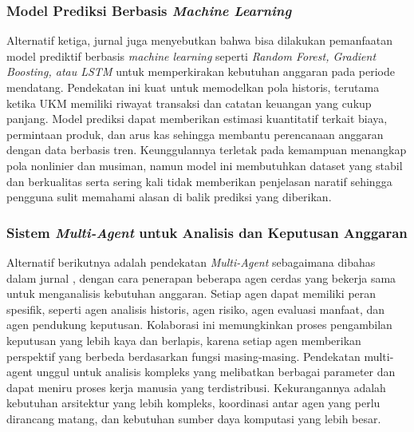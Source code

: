 \subsubsection{Model Prediksi Berbasis  \textit{Machine Learning}}
Alternatif ketiga, jurnal \textcite{Vivet2023} juga menyebutkan bahwa bisa dilakukan pemanfaatan model prediktif berbasis \textit{machine learning} seperti \textit{Random Forest, Gradient Boosting, atau LSTM} untuk memperkirakan kebutuhan anggaran pada periode mendatang. Pendekatan ini kuat untuk memodelkan pola historis, terutama ketika UKM memiliki riwayat transaksi dan catatan keuangan yang cukup panjang. Model prediksi dapat memberikan estimasi kuantitatif terkait biaya, permintaan produk, dan arus kas sehingga membantu perencanaan anggaran dengan data berbasis tren. Keunggulannya terletak pada kemampuan menangkap pola nonlinier dan musiman, namun model ini membutuhkan dataset yang stabil dan berkualitas serta sering kali tidak memberikan penjelasan naratif sehingga pengguna sulit memahami alasan di balik prediksi yang diberikan.

\subsubsection{Sistem \textit{Multi-Agent} untuk Analisis dan Keputusan Anggaran}
Alternatif berikutnya adalah pendekatan \textit{Multi-Agent} sebagaimana dibahas dalam jurnal \textcite{Joshi2025}, dengan cara penerapan beberapa agen cerdas yang bekerja sama untuk menganalisis kebutuhan anggaran. Setiap agen dapat memiliki peran spesifik, seperti agen analisis historis, agen risiko, agen evaluasi manfaat, dan agen pendukung keputusan. Kolaborasi ini memungkinkan proses pengambilan keputusan yang lebih kaya dan berlapis, karena setiap agen memberikan perspektif yang berbeda berdasarkan fungsi masing-masing. Pendekatan multi-agent unggul untuk analisis kompleks yang melibatkan berbagai parameter dan dapat meniru proses kerja manusia yang terdistribusi. Kekurangannya adalah kebutuhan arsitektur yang lebih kompleks, koordinasi antar agen yang perlu dirancang matang, dan kebutuhan sumber daya komputasi yang lebih besar.

